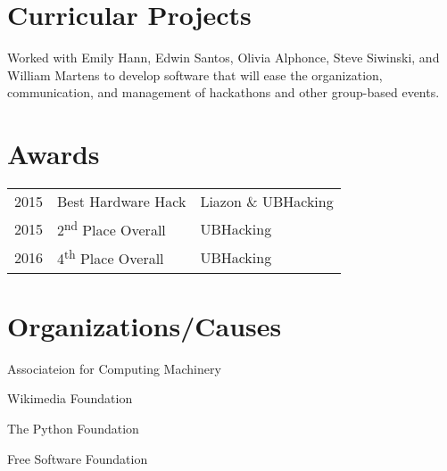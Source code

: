 \documentclass[]{deedy-resume-openfont}
\begin{document}
\begin{minipage}[t]{0.66\textwidth}

\section{Curricular Projects}
Worked with Emily Hann, Edwin Santos, Olivia Alphonce, Steve Siwinski, and William Martens to develop software that will ease the organization, communication, and management of hackathons and other group-based events.
\sectionsep


\section{Awards} 
\begin{tabular}{rll}
2015     & Best Hardware Hack  & Liazon \& UBHacking\\
2015     & 2\textsuperscript{nd} Place Overall  & UBHacking\\
2016     & 4\textsuperscript{th} Place Overall  & UBHacking\\
\end{tabular}
\sectionsep


\section{Organizations/Causes} 
\vspace{\topsep} %
\begin{tightemize}
\item Associateion for Computing Machinery\item Wikimedia Foundation\item The Python Foundation \item Free Software Foundation \end{tightemize}
\sectionsep

\end{minipage} 
\end{document}
